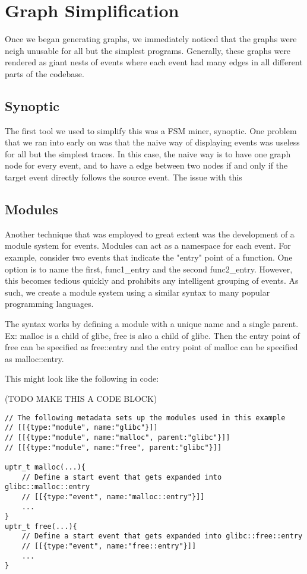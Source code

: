 \chapter{Graph Simplification}

Once we began generating graphs, we immediately noticed that the graphs were neigh unusable for all but the simplest programs. Generally, these graphs were rendered as giant nests of events where each event had many edges in all different parts of the codebase. 

\section{Synoptic}
The first tool we used to simplify this was a FSM miner, synoptic. One problem that we ran into early on was that the naive way of displaying events was useless for all but the simplest traces. In this case, the naive way is to have one graph node for every event, and to have a edge between two nodes if and only if the target event directly follows the source event. The issue with this 




\section{Modules}
Another technique that was employed to great extent was the development of a module system for events. Modules can act as a namespace for each event. For example, consider two events that indicate the "entry" point of a function. One option is to name the first, func1\_entry and the second func2\_entry. However, this becomes tedious quickly and prohibits any intelligent grouping of events. As such, we create a module system using a similar syntax to many popular programming languages. 

The syntax works by defining a module with a unique name and a single parent. Ex: malloc is a child of glibc, free is also a child of glibc. Then the entry point of free can be specified as free::entry and the entry point of malloc can be specified as malloc::entry. 

This might look like the following in code:

(TODO MAKE THIS A CODE BLOCK)
\begin{verbatim}
// The following metadata sets up the modules used in this example
// [[{type:"module", name:"glibc"}]]
// [[{type:"module", name:"malloc", parent:"glibc"}]]
// [[{type:"module", name:"free", parent:"glibc"}]]

uptr_t malloc(...){
    // Define a start event that gets expanded into glibc::malloc::entry
    // [[{type:"event", name:"malloc::entry"}]]
    ...
}
uptr_t free(...){
    // Define a start event that gets expanded into glibc::free::entry
    // [[{type:"event", name:"free::entry"}]]
    ...
}
\end{verbatim}

